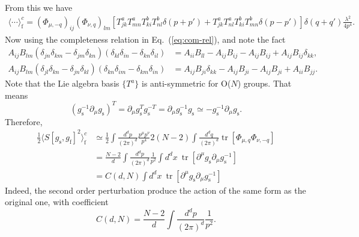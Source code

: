 \documentclass[aps,prb,superscriptaddress,nofootinbib]{revtex4}
\def \tr{\operatorname{tr}}
\begin{document}
From this we have
\begin{equation}
\begin{aligned}
	\langle \cdots \rangle^c_{\mathrm{f}}
	= (\Phi_{\mu,-q})_{ij} (\Phi_{\nu,q})_{lm} \left[T_{jk}^a T_{mn}^a T_{ki}^b T_{nl}^b \delta(p+p') +T_{jk}^a T_{nl}^a T_{ki}^b T_{mn}^b \delta(p-p')\right] \delta(q+q')\frac{\lambda^2}{4p^4}.
\end{aligned}
\end{equation}
Now using the completeness relation in Eq.~(\ref{eq:com-rel}), and note the fact
\begin{equation}
\begin{aligned}
	A_{ij}B_{lm}(\delta_{jn}\delta_{km}-\delta_{jm}\delta_{kn})(\delta_{kl}\delta_{in}-\delta_{kn}\delta_{il})
	&= A_{ii}B_{ll} - A_{ij}B_{ij} - A_{ij}B_{ij}+A_{ij}B_{ij}\delta_{kk}, \\
	A_{ij}B_{lm}(\delta_{jl}\delta_{kn}-\delta_{jn}\delta_{kl})(\delta_{kn}\delta_{im}-\delta_{km}\delta_{in})
	&= A_{ij}B_{ji}\delta_{kk} - A_{ij}B_{ji}-A_{ij}B_{ji}+A_{ii}B_{jj}.
\end{aligned}
\end{equation}
Note that the Lie algebra basis $\{T^a\}$ is anti-symmetric for O($N$) groups. 
That means
\begin{equation}
	\left(g_{\mathrm{s}}^{-1}\partial_\mu g_{\mathrm{s}}\right)^T = \partial_\mu g_{\mathrm{s}}^T g_{\mathrm{s}}^{-T}
	=\partial_\mu g_{\mathrm{s}}^{-1} g_{\mathrm{s}} 
	\simeq -g_{\mathrm{s}}^{-1} \partial_\mu g_{\mathrm{s}}.
\end{equation}
Therefore,
\begin{equation}
\begin{aligned}
	\frac{1}{2}\langle S[g_{\mathrm{s}},g_{\mathrm{f}}]^2\rangle_{\mathrm{f}}^c
	&\simeq \frac{1}{2} \int \frac{d^d p}{(2\pi)^d}  \frac{p^\mu p^\nu}{p^4} 2(N-2) \int \frac{d^d q}{(2\pi)^d} \tr[\Phi_{\mu,q}\Phi_{\nu,-q}] \\
	&= \frac{N-2}{d}\int \frac{d^d p}{(2\pi)^d}  \frac{1}{p^2} \int d^d x\ \tr[\partial^\mu g_{\mathrm{s}} \partial_\mu g_{\mathrm{s}}^{-1}] \\
	&= C(d,N) \int d^d x\ \tr[\partial^\mu g_{\mathrm{s}} \partial_\mu g_{\mathrm{s}}^{-1}]
\end{aligned}
\end{equation}
Indeed, the second order perturbation produce the action of the same form as the original one, with coefficient
\begin{equation}
	C(d,N) = \frac{N-2}{d}\int \frac{d^d p}{(2\pi)^d}  \frac{1}{p^2}.
\end{equation}
\end{document}
